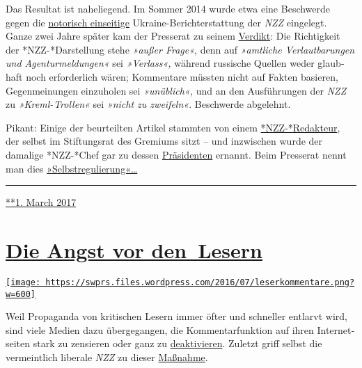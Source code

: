 Das Resultat ist naheliegend. Im Som­mer 2014 wurde etwa eine
Be­schwerde gegen die
\href{https://swprs.org/die-nzz-studie/}{no­to­risch ein­sei­tige}
Ukraine-Bericht­er­stattung der \emph{NZZ} ein­ge­legt. Ganze zwei Jahre
später kam der Presse­rat zu seinem
\href{https://presserat.ch/complaints/wahrheitspflicht-kommentarfreiheit-unterschlagen-wichtiger-informationen-entstellen-von-tatsachen/}{Verdikt}:
Die Rich­tig­keit der *NZZ- *Dar­stel­lung stehe \emph{»außer Frage«},
denn auf \emph{»amt­liche Ver­laut­ba­rungen und Agen­tur­mel­dungen«}
sei \emph{»Verlass«,} während russische Quel­len weder glaub­haf‌t noch
erforderlich wären; Kom­men­tare müss­ten nicht auf Fak­ten ba­sie­ren,
Ge­gen­mei­nungen ein­zu­holen sei \emph{»un­üb­lich«,} und an den
Aus­füh­rungen der \emph{NZZ} zu \emph{»Kreml- Trollen«} sei
\emph{»nicht zu zwei­feln«}. Be­schwerde ab­ge­lehnt.

Pikant: Einige der be­ur­teil­ten Ar­tikel stam­mten von einem
\href{http://www.nzz.ch/international/europa/beschwerde-beim-presserat-kritik-an-nzz-abgewiesen-ld.104814}{*NZZ-*Redak­teur},
der selbst im Stif‌­tungs­rat des Gremiums sitzt -- und inzwischen wurde
der damalige *NZZ-*Chef gar zu dessen
\href{http://www.nzz.ch/schweiz/medien-selbstregulierung-markus-spillmann-wird-praesident-des-presserats-ld.135619}{Prä­si­denten}
ernannt. Beim Presse­rat nennt man dies
\href{https://de.wikipedia.org/wiki/Schweizer_Presserat}{»Selbst­re­gu­lierung«\ldots{}}

\begin{center}\rule{0.5\linewidth}{\linethickness}\end{center}

\href{https://swprs.org/2017/03/01/der-schweizer-presserat/}{**1. March
2017}

\hypertarget{die-angst-vor-den-lesern}{%
\section{\texorpdfstring{\href{https://swprs.org/2017/03/01/leserkommentare/}{Die
Angst vor
den~Lesern}}{Die Angst vor den~Lesern}}\label{die-angst-vor-den-lesern}}

\href{https://swprs.org/2017/03/01/leserkommentare/}{\texttt{[image: https://swprs.files.wordpress.com/2016/07/leserkommentare.png?w=600]}}

Weil Propaganda von kritischen Lesern immer öfter und schneller entlarvt
wird, sind viele Medien dazu über­ge­gangen, die Kommentar­funktion auf
ihren Inter­net­­seiten stark zu zensieren oder ganz zu
\href{https://www.heise.de/tp/features/Konzentriertes-Gejammer-NZZ-schliesst-Kommentarspalte-3618957.html}{deaktivieren}.
Zuletzt griff selbst die vermeintlich liberale \emph{NZZ} zu dieser
\href{https://www.heise.de/tp/features/Konzentriertes-Gejammer-NZZ-schliesst-Kommentarspalte-3618957.html}{Maßnahme}.

